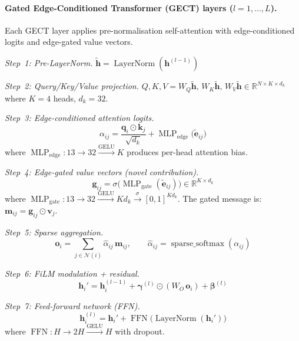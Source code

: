 \documentclass[11pt]{article}
\begin{document}
\paragraph{Gated Edge-Conditioned Transformer (GECT) layers ($l = 1, \ldots, L$).}
Each GECT layer applies pre-normalisation self-attention with
edge-conditioned logits and edge-gated value vectors.

\textit{Step~1: Pre-LayerNorm.}
$\tilde{\mathbf{h}} = \operatorname{LayerNorm}(\mathbf{h}^{(l-1)})$

\textit{Step~2: Query/Key/Value projection.}
$Q, K, V = W_Q \tilde{\mathbf{h}},\, W_K \tilde{\mathbf{h}},\,
W_V \tilde{\mathbf{h}} \in \mathbb{R}^{N \times K \times d_k}$
where $K = 4$ heads, $d_k = 32$.

\textit{Step~3: Edge-conditioned attention logits.}
\begin{equation}
  \alpha_{ij} = \frac{
    \mathbf{q}_i \odot \mathbf{k}_j
  }{\sqrt{d_k}}
  + \operatorname{MLP}_{\mathrm{edge}}\!\bigl(
    \tilde{\mathbf{e}}_{ij}\bigr)
  \label{eq:gect_attn}
\end{equation}
where $\operatorname{MLP}_{\mathrm{edge}}: 13 \to 32
\xrightarrow{\mathrm{GELU}} K$ produces per-head attention bias.

\textit{Step~4: Edge-gated value vectors (novel contribution).}
\begin{equation}
  \mathbf{g}_{ij} = \sigma\!\bigl(
    \operatorname{MLP}_{\mathrm{gate}}(\tilde{\mathbf{e}}_{ij})
  \bigr)
  \in \mathbb{R}^{K \times d_k}
  \label{eq:edge_gate}
\end{equation}
where $\operatorname{MLP}_{\mathrm{gate}}: 13 \to 32
\xrightarrow{\mathrm{GELU}} Kd_k \xrightarrow{\sigma} [0,1]^{Kd_k}$.
The gated message is:
$\mathbf{m}_{ij} = \mathbf{g}_{ij} \odot \mathbf{v}_j$.

\textit{Step~5: Sparse aggregation.}
\begin{equation}
  \mathbf{o}_i = \sum_{j \in \mathcal{N}(i)}
  \hat{\alpha}_{ij}\, \mathbf{m}_{ij}, \qquad
  \hat{\alpha}_{ij} = \operatorname{sparse\_softmax}(\alpha_{ij})
\end{equation}

\textit{Step~6: FiLM modulation + residual.}
\begin{equation}
  \mathbf{h}_i' = \mathbf{h}_i^{(l-1)}
  + \boldsymbol{\gamma}^{(l)} \odot (W_O\, \mathbf{o}_i)
  + \boldsymbol{\beta}^{(l)}
  \label{eq:film_mod}
\end{equation}

\textit{Step~7: Feed-forward network (FFN).}
\begin{equation}
  \mathbf{h}_i^{(l)} = \mathbf{h}_i'
  + \operatorname{FFN}\!\bigl(\operatorname{LayerNorm}(\mathbf{h}_i')\bigr)
\end{equation}
where $\operatorname{FFN}: H \to 2H \xrightarrow{\mathrm{GELU}} H$ with
dropout.
\end{document}
